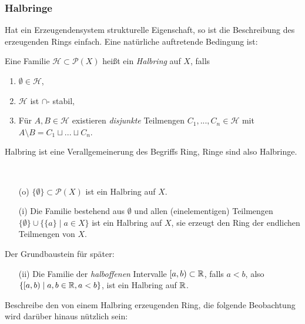 \subsubsection{Halbringe}
Hat ein Erzeugendensystem strukturelle Eigenschaft, so ist die Beschreibung des erzeugenden Rings einfach. Eine natürliche auftretende Bedingung ist:
\begin{definition}
\begin{mdframed}
Eine Familie $\mathcal{H}\subset \mathcal{P}(X)$ heißt ein \emph{Halbring} auf $X$, falls
\begin{enumerate}[(\roman*), topsep=3pt, itemsep=0pt]
	\item $\emptyset \in \mathcal{H}$,
	\item $\mathcal{H}$ ist $\cap$- stabil,
	\item Für $A,B \in \mathcal{H}$ existieren \emph{disjunkte} Teilmengen $C_1,...,C_n \in \mathcal{H}$ mit $A\setminus B = C_1 \sqcup ...\sqcup C_n$.
\end{enumerate}
\end{mdframed}
\end{definition}
\begin{remark}
Halbring ist eine Verallgemeinerung des Begriffs Ring, Ringe sind also Halbringe.
\end{remark}
\begin{example} \
\begin{enumerate}
	\item[(o)] $\{ \emptyset\} \subset \mathcal{P}(X)$ ist ein Halbring auf $X$.
	\item[(i)] Die Familie bestehend aus $\emptyset$ und allen (einelementigen) Teilmengen $\{\emptyset\} \cup \{ \{a\} \mid a \in X \}$  ist ein Halbring auf $X$, sie erzeugt den Ring der endlichen Teilmengen von $X$.
\end{enumerate}
Der Grundbaustein für später:
\begin{enumerate}
	\item[(ii)] Die Familie der \emph{halboffenen} Intervalle $[a,b) \subset \mathbb{R}$, falls $a<b$, also $\{[a,b) \mid a,b \in \mathbb{R}, a<b\}$, ist ein Halbring auf $\mathbb{R}$.
\end{enumerate}
\end{example}
Beschreibe den von einem Halbring erzeugenden Ring, die folgende Beobachtung wird darüber hinaus nützlich sein:

